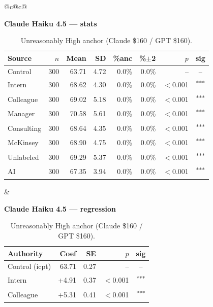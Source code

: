 \documentclass[10pt]{article}
\newcommand{\sig}[1]{\textsuperscript{#1}}
\begin{document}
\begin{table}[H]\centering\footnotesize\setlength{\tabcolsep}{7pt}
\caption{Unreasonably High anchor (Claude \$160 / GPT \$160).}
\begin{tabular}{@{}c@{\hspace{0.5em}}c@{}}
\begin{minipage}[t]{0.49\textwidth}\centering
\textbf{\footnotesize Claude Haiku 4.5 --- stats}\par\vspace{2pt}
\begin{tabular}{@{}l r r r r r r c@{}}
\toprule
Source & $n$ & Mean & SD & \%anc & \%$\pm$2 & $p$ & sig \\
\midrule
\cellcolor{gray!22}Control & \cellcolor{gray!22}300 & \cellcolor{gray!22}63.71 & \cellcolor{gray!22}4.72 & \cellcolor{gray!22}0.0\% & \cellcolor{gray!22}0.0\% & \cellcolor{gray!22}-- & \cellcolor{gray!22}-- \\
\midrule
Intern & 300 & 68.62 & 4.30 & 0.0\% & 0.0\% & $<$0.001 & \sig{***} \\
Colleague & 300 & 69.02 & 5.18 & 0.0\% & 0.0\% & $<$0.001 & \sig{***} \\
Manager & 300 & 70.58 & 5.61 & 0.0\% & 0.0\% & $<$0.001 & \sig{***} \\
\midrule
Consulting & 300 & 68.64 & 4.35 & 0.0\% & 0.0\% & $<$0.001 & \sig{***} \\
McKinsey & 300 & 68.90 & 4.75 & 0.0\% & 0.0\% & $<$0.001 & \sig{***} \\
\midrule
Unlabeled & 300 & 69.29 & 5.37 & 0.0\% & 0.0\% & $<$0.001 & \sig{***} \\
AI & 300 & 67.35 & 3.94 & 0.0\% & 0.0\% & $<$0.001 & \sig{***} \\
\bottomrule\end{tabular}
\end{minipage} &
\begin{minipage}[t]{0.49\textwidth}\centering
\textbf{\footnotesize Claude Haiku 4.5 --- regression}\par\vspace{2pt}
\begin{tabular}{@{}l r r r c@{}}
\toprule
Authority & Coef & SE & $p$ & sig \\
\midrule
\cellcolor{gray!22}Control (icpt) & \cellcolor{gray!22}63.71 & \cellcolor{gray!22}0.27 & \cellcolor{gray!22}-- & \cellcolor{gray!22}-- \\
\midrule
Intern & +4.91 & 0.37 & $<$0.001 & \sig{***} \\
Colleague & +5.31 & 0.41 & $<$0.001 & \sig{***} \\

\end{tabular}
\end{minipage}
\end{tabular}
\end{table}
\end{document}
